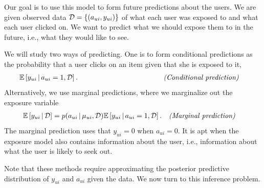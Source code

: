 Our goal is to use this model to form
future predictions about the users.  We are given observed data
$\mathcal{D} = \{(a_{ui}, y_{ui})\}$ of what each user was exposed to and
what each user clicked on.  We want to predict what we should expose
them to in the future, i.e., what they would like to see.

We will study two ways of predicting. One is to form conditional
predictions as the probability that a user clicks on an item given
that she is exposed to it,
\begin{align}
  &\mathbb{E}\left[y_{ui} \,\vert\, a_{ui} = 1, \mathcal{D}\right].  &\quad\quad\quad\quad\quad\quad\quad\quad\quad\quad\quad\textit{(Conditional prediction)}&
  \label{eq:conditional-prediction}
\end{align}
Alternatively, we use marginal predictions, where we marginalize out
the exposure variable
\begin{align}
  &\mathbb{E}\left[y_{ui} \,\vert\, \mathcal{D}\right] = p(a_{ui} \,\vert\, \mu_{ui}, \mathcal{D}) \mathbb{E}\left[y_{ui} \,\vert\, a_{ui} =
  1, \mathcal{D}\right]. & \textit{(Marginal prediction)}&
  \label{eq:marginal_preds}
\end{align}
The marginal prediction uses that $y_{ui} = 0$ when $a_{ui} = 0$.  It
is apt when the exposure model also contains information about the
user, i.e., information about what the user is likely to seek out.





Note that these methods require approximating the posterior predictive
distribution of $y_{ui}$ and $a_{ui}$ given the data.  We now turn to
this inference problem.



